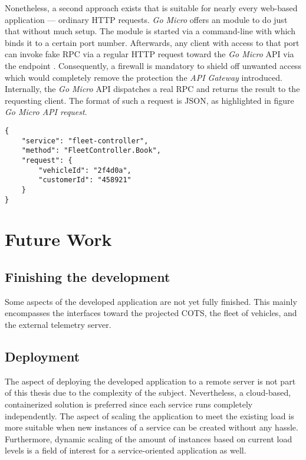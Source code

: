 \documentclass[12pt,a4paper,twoside]{report}
\begin{document}
Nonetheless, a second approach exists that is suitable for nearly every
web-based application --- ordinary HTTP requests.
\textit{Go Micro} offers an  module to do just that without much
setup. The  module is started via a command-line with
 which binds it to a certain port number.
Afterwards, any client with access to that port can invoke fake RPC via a regular
HTTP request toward the \textit{Go Micro} API via the endpoint .
Consequently, a firewall is mandatory to shield off unwanted access which
would completely remove the protection the \textit{API Gateway} introduced.
Internally, the \textit{Go Micro} API dispatches a real RPC and returns the
result to the requesting client. The format of such a request is JSON,
as highlighted in figure \textit{Go Micro API request}.

\begin{lstlisting}[title=\textit{Go Micro} API request, float, floatplacement=H]
{
	"service": "fleet-controller",
	"method": "FleetController.Book",
	"request": {
		"vehicleId": "2f4d0a",
		"customerId": "458921"
	}
}
\end{lstlisting}



\chapter{Future Work} \label{chap:future-work}



\section{Finishing the development}

Some aspects of the developed application are not yet fully finished.
This mainly encompasses the interfaces toward the projected COTS,
the fleet of vehicles, and the external telemetry server.


\section{Deployment}

The aspect of deploying the developed application to a remote server is
not part of this thesis due to the complexity of the subject.
Nevertheless, a cloud-based, containerized solution is preferred since
each service runs completely independently. The aspect of scaling the application
to meet the existing load is more suitable when new instances of a service
can be created without any hassle. Furthermore, dynamic scaling of the amount
of instances based on current load levels is a field of interest for a
service-oriented application as well.
\end{document}
